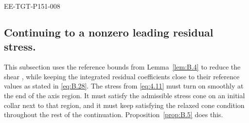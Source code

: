 \begin{EESegment}{EE-TGT-P151-008}
\subsection{Continuing to a nonzero leading residual stress.}\label{sec:B.6}
This subsection uses the reference bounds from Lemma~\ref{lem:B.4} to reduce the shear
, while keeping the integrated residual coefficients
 close to their reference values as stated in \eqref{eq:B.28}. The stress
 from \eqref{eq:4.11} must turn on smoothly
at the end of the axis region. It must satisfy the admissible stress cone on an initial collar next
to that region, and it must keep satisfying the relaxed cone condition throughout the rest of the
continuation. Proposition~\ref{prop:B.5} does this.
\end{EESegment}

